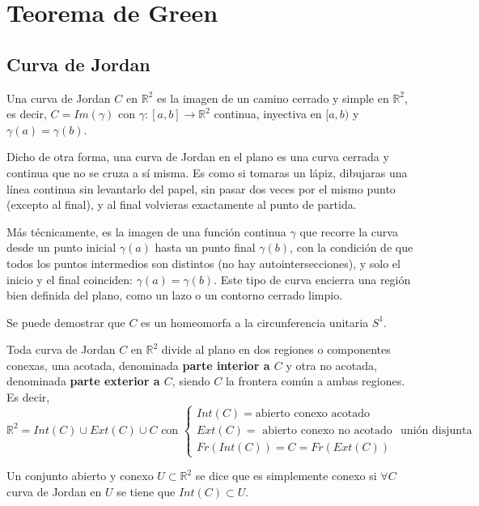 \section{Teorema de Green}

\subsection{Curva de Jordan} 
\begin{definición}
Una curva de Jordan $C$ en $\mathbb{R}^2$ es la imagen de un camino cerrado y simple en $\mathbb{R}^2$, es decir, $C = Im(\gamma)$ con $\gamma: [a,b] \to \mathbb{R}^2$ continua, inyectiva en $[a, b)$ y $\gamma(a) = \gamma(b)$.
\end{definición}
Dicho de otra forma, una curva de Jordan en el plano es una curva cerrada y continua que no se cruza a sí misma. Es como si tomaras un lápiz, dibujaras una línea continua sin levantarlo del papel, sin pasar dos veces por el mismo punto (excepto al final), y al final volvieras exactamente al punto de partida.

Más técnicamente, es la imagen de una función continua \( \gamma \) que recorre
la curva desde un punto inicial \( \gamma(a) \) hasta un punto final \(
\gamma(b) \), con la condición de que todos los puntos intermedios son
distintos (no hay autointersecciones), y solo el inicio y el final coinciden:
\( \gamma(a) = \gamma(b) \). Este tipo de curva encierra una región bien
definida del plano, como un lazo o un contorno cerrado limpio.\\

\begin{observación}
Se puede demostrar que $C$ es un homeomorfa a la circunferencia unitaria $S^1$.
\end{observación}
\begin{teorema}
    Toda curva de Jordan $C$ en $\mathbb{R}^2$ divide al plano en dos regiones  o componentes conexas, una acotada, denominada \textbf{parte interior a $C$} y otra no acotada, denominada \textbf{parte exterior a $C$}, siendo $C$ la frontera común a ambas regiones. Es decir,
    $$\mathbb{R}^2 = Int(C) \cup Ext(C) \cup C \text{ con } \begin{cases}
            Int(C) = \text{abierto conexo acotado} \\ Ext(C) = \text{ abierto conexo no acotado} \\ Fr(Int(C)) = C = Fr(Ext(C))
        \end{cases} \text{ unión disjunta}$$
\end{teorema}
\begin{definición}
Un conjunto abierto y conexo $U \subset \mathbb{R}^2$ se dice que es simplemente conexo si $\forall C$ curva de Jordan en $U$ se tiene que $Int(C) \subset U$.
\end{definición}

